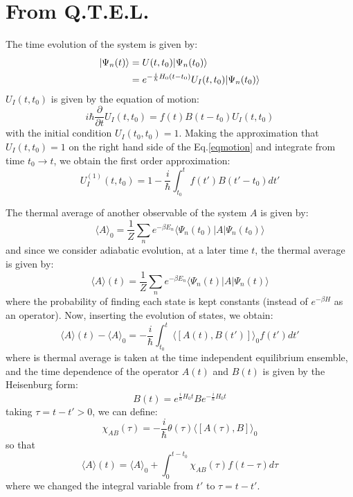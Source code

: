 \documentclass{article}
\begin{document}
\pagebreak
\section{From Q.T.E.L.}
The time evolution of the system is given by:
\begin{align}
    | \Psi_n(t) \rangle &= U(t,t_0) | \Psi_n(t_0) \rangle \notag \\
                     &= e^{-\frac{i}{\hbar}H_0(t-t_0)} U_I(t,t_0) | \Psi_n(t_0) \rangle \notag 
\end{align}
$U_I(t,t_0)$ is given by the equation of motion:
\begin{equation}
    i\hbar \frac{\partial}{\partial t} U_I(t,t_0) = f(t) B(t-t_0) U_I(t,t_0) \label{eqmotion}
\end{equation}
with the initial condition $U_I(t_0,t_0) = 1$. Making the approximation that $U_I(t,t_0) = 1$ on the 
right hand side of the Eq.\ref{eqmotion} and integrate from time $t_0 \to t$, we obtain the first order approximation:
\begin{equation}
    U_I^{(1)}(t,t_0) = 1 - \frac{i}{\hbar} \int_{t_0}^{t} f(t') B(t'-t_0) dt'
\end{equation}

The thermal average of another observable of the system $A$ is given by:
\begin{equation}
    \langle A\rangle_0 = \frac{1}{Z} \sum_n e^{-\beta E_n} \langle \Psi_n(t_0) | A | \Psi_n(t_0) \rangle 
\end{equation}
and since we consider adiabatic evolution, at a later time $t$, the thermal average is 
given by:
\begin{equation}
    \langle A\rangle(t) = \frac{1}{Z} \sum_n e^{-\beta E_n} \langle \Psi_n(t) | A | \Psi_n(t) \rangle 
\end{equation}
where the probability of finding each state is kept constants (instead of $e^{-\beta H}$ as an operator).
Now, inserting the evolution of states, we obtain:
\begin{equation}
    \langle A\rangle(t) - \langle A\rangle_0 = -\frac{i}{\hbar} \int_{t_0}^{t} \langle [ A(t), B(t') ] \rangle_0 f(t') dt'
\end{equation} 
where is thermal average is taken at the time independent equilibrium ensemble, and the time dependence of
the operator $A(t)$ and $B(t)$ is given by the Heisenburg form:
\begin{equation}
    B(t) = e^{\frac{i}{\hbar}H_0t} B e^{-\frac{i}{\hbar}H_0t}
\end{equation}
taking $\tau = t - t' > 0$, we can define:
\begin{equation}
    \chi_{AB}(\tau) = -\frac{i}{\hbar} \theta(\tau) \langle [ A(\tau), B ] \rangle_0 \label{responsefunction}
\end{equation}
so that 
\begin{equation}
    \langle A\rangle(t) = \langle A\rangle_0 + \int_{0}^{t-t_0} \chi_{AB}(\tau) f(t - \tau) d\tau
\end{equation} 
where we changed the integral variable from $t'$ to $\tau = t - t'$. 
\end{document}
